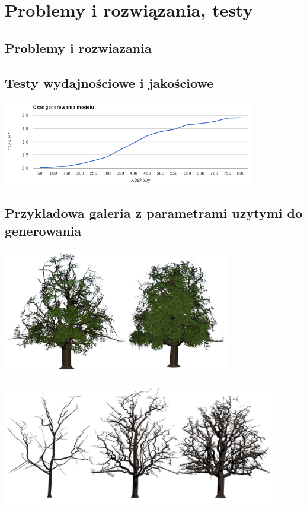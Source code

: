 
\chapter{Problemy i rozwiązania, testy}

\section{Problemy i rozwiazania}

\section{Testy wydajnościowe i jakościowe}

\begin{center}
	\includegraphics[width=110mm]{images/colonization/time.png}
\end{center}


\section{Przykladowa galeria z parametrami uzytymi do generowania}

\begin{center}
	\includegraphics[width=100mm]{images/renders/greentree.png}
\end{center}

\begin{center}
	\includegraphics[width=120mm]{images/renders/points.png}
\end{center}

